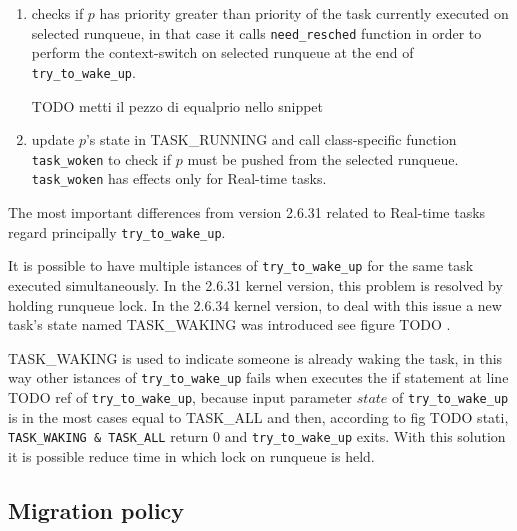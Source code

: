 \begin{enumerate}
\item checks if $p$ has priority greater than priority of the task currently
executed on selected runqueue, in that case it calls \texttt{need\_resched}
function in order to perform the context-switch on selected runqueue at the
end of \texttt{try\_to\_wake\_up}.

TODO metti il pezzo di equalprio nello snippet
\lstset{basicstyle=\footnotesize, language=c, captionpos=b, frame=single,label=lis:steps}


\item update $p$'s state in TASK\_RUNNING and call class-specific function 
\texttt{task\_woken} to check if $p$ must be pushed from the selected runqueue.
\texttt{task\_woken} has effects only for Real-time tasks.

\lstset{basicstyle=\footnotesize, language=c, captionpos=b, frame=single,label=lis:steps}


\end{enumerate}

The most important differences from version 2.6.31 related to Real-time tasks regard principally \texttt{try\_to\_wake\_up}.

It is possible to have multiple istances of \texttt{try\_to\_wake\_up} for the same task executed simultaneously. In the 2.6.31 kernel version, this problem
is resolved by holding runqueue lock. In the 2.6.34 kernel version, to deal with this issue a new task's state named TASK\_WAKING was introduced see 
figure TODO . 

\lstset{basicstyle=\footnotesize, language=c, captionpos=b, frame=single,label=lis:steps}


TASK\_WAKING is used to indicate someone is already waking the task, in this way other istances of \texttt{try\_to\_wake\_up} fails when executes the if 
statement at line TODO ref of \texttt{try\_to\_wake\_up}, because input parameter $state$ of \texttt{try\_to\_wake\_up} is in the most cases equal to 
TASK\_ALL and then, according to fig TODO stati, \texttt{TASK\_WAKING \& TASK\_ALL} return 0 and \texttt{try\_to\_wake\_up} exits. With this solution 
it is possible reduce time in which lock on runqueue is held. 


\subsection{Migration policy}


